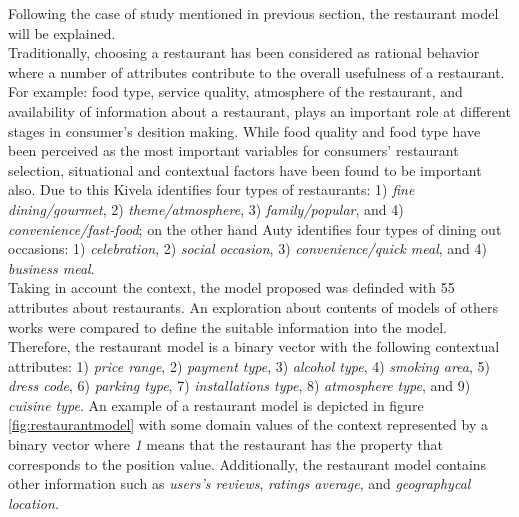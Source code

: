 Following the case of study mentioned in previous section,   the
restaurant model will be explained.\\  Traditionally, choosing a
restaurant has been considered as rational behavior where a number of
attributes contribute to the overall usefulness of a restaurant. For
example: food type, service quality, atmosphere of the restaurant, and
availability of information about a restaurant, plays an important
role at different stages in consumer's desition
making\cite{auty1992consumer}. While food quality and food type have
been perceived as the most important variables for consumers'
restaurant selection, situational and contextual factors have been
found to be important also. Due to this
Kivela\cite{jack1997restaurant} identifies four types of restaurants:
1) \textit{fine dining/gourmet}, 2) \textit{theme/atmosphere}, 3)
\textit{family/popular}, and 4) \textit{convenience/fast-food}; on the
other hand Auty\cite{auty1992consumer} identifies four types of dining
out occasions: 1) \textit{celebration}, 2) \textit{social occasion},
3) \textit{convenience/quick meal}, and 4) \textit{business meal}.\\
Taking in account the context, the model proposed was definded with 55
attributes about restaurants. An exploration about contents of models
of others works were compared to define the suitable information into
the model. Therefore, the restaurant model is a binary vector with the
following contextual attributes: 1) \textit{price range}, 2)
\textit{payment type}, 3) \textit{alcohol type}, 
4) \textit{smoking area}, 5) \textit{dress code}, 6) \textit{parking type}, 7)
\textit{installations type}, 8) \textit{atmosphere type}, and 9)
\textit{cuisine type}. An example of a restaurant model is depicted in
figure \ref{fig:restaurantmodel} with some domain values of the
context represented by a binary vector where \textit{1} means that the
restaurant has the property that corresponds to the position value.
Additionally, the restaurant model contains other information such as
\textit{users's reviews}, \textit{ratings average}, and
\textit{geographycal location.}
